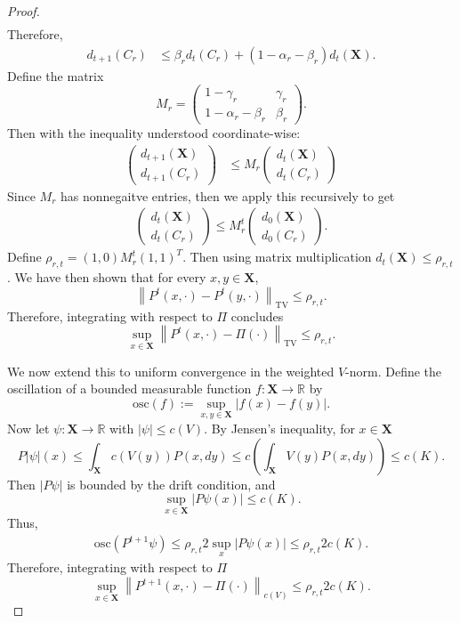 \documentclass[ejsv2, noshowframe]{imsart}
\theoremstyle{plain}
\theoremstyle{definition}
\theoremstyle{remark}
\newcommand{\norm}[1]{\left\lVert#1\right\rVert}
\newcommand{\R}{\mathbb{R}}
\renewcommand{\P}{P}
\newcommand{\X}{\textbf{X}}
\begin{document}
\begin{proof}
\begin{align*}
\end{align*}
Therefore,
\begin{align*}
d_{t+1}(C_r) &\le \beta_r d_{t}(C_r) + \left( 1 - \alpha_r - \beta_r \right) d_{t}(\X).
\end{align*}
Define the matrix 
\[
M_r = \begin{pmatrix}
1 - \gamma_r & \gamma_r \\
1 - \alpha_r - \beta_r  & \beta_r
\end{pmatrix}.
\]
Then with the inequality understood coordinate-wise:
\begin{align*}
\begin{pmatrix}
d_{t+1}(\X) \\
d_{t+1}(C_r)
\end{pmatrix}
&\le M_r \begin{pmatrix}
d_{t}(\X) \\
d_{t}(C_r)
\end{pmatrix}
\end{align*}
Since $M_r$ has nonnegaitve entries, then we apply this recursively to get
\begin{align*}
\begin{pmatrix}
d_{t}(\X) \\
d_{t}(C_r)
\end{pmatrix}
\le M_r^{t} \begin{pmatrix}
d_{0}(\X) \\
d_{0}(C_r)
\end{pmatrix}.
\end{align*}
Define $\rho_{r, t} = (1, 0) M_r^t (1, 1)^T$.
Then using matrix multiplication $d_{t}(\X) \le \rho_{r, t}$.
We have then shown that for every $x, y \in \X$,
\[
\norm{\P^t(x, \cdot) - \P^t(y, \cdot)}_{\text{TV}}
\le \rho_{r, t}.
\]
Therefore, integrating with respect to $\Pi$ concludes
\[
\sup_{x \in \X} \norm{\P^t(x, \cdot) - \Pi(\cdot)}_{\text{TV}}
\le \rho_{r, t}.
\]

We now extend this to uniform convergence in the weighted $V$-norm. 
Define the oscillation of a bounded measurable function $f : \X \to \R$ by
\[
\text{osc}(f) := \sup_{x,y \in \X} |f(x) - f(y)|.
\]
Now let $\psi : \X \to \R$ with $|\psi| \le c(V)$. 
By Jensen's inequality, for $x \in \X$
\[
\P |\psi|(x) 
\le \int_{\X} c(V(y)) \P(x, dy)
\le c\left( \int_{\X} V(y) \P(x, dy) \right)
\le c( K ).
\]
Then $| P\psi |$ is bounded by the drift condition, and
\[
\sup_{x \in \X} |P\psi(x)| \le c( K ).
\]
Thus,
\begin{align*}
\text{osc}(P^{t+1}\psi)
\le \rho_{r, t}  2 \sup_{x} |P\psi(x)|
\le \rho_{r, t}  2 c(K).
\end{align*}
Therefore, integrating with respect to $\Pi$
\[
\sup_{x \in \X} \norm{\P^{t + 1}(x, \cdot) - \Pi(\cdot)}_{c(V)}
\le \rho_{r, t} 2 c(K).
\]


\end{proof}
\end{document}
